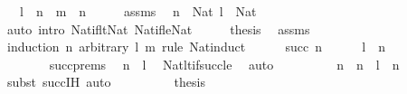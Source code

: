 \begin{isabellebody}
\ \ \ {\isachardoublequoteopen}l\ {\isacharminus}{\kern0pt}\ n\ {\isacharless}{\kern0pt}\ m\ {\isacharminus}{\kern0pt}\ n{\isachardoublequoteclose}\isanewline
%
\isadelimproof
%
\endisadelimproof
%
\isatagproof
{}\isamarkupfalse%
\ {\isacharminus}{\kern0pt}\isanewline
\ \ \isamarkupfalse%
\ assms\ \isamarkupfalse%
\ {\isachardoublequoteopen}n\ {\isacharcolon}{\kern0pt}\ Nat{\isachardoublequoteclose}\ {\isachardoublequoteopen}l\ {\isacharcolon}{\kern0pt}\ Nat{\isachardoublequoteclose}\isanewline
\ \ \ \ \isamarkupfalse%
\ {\isacharparenleft}{\kern0pt}auto\ intro{\isacharcolon}{\kern0pt}\ Nat{\isacharunderscore}{\kern0pt}if{\isacharunderscore}{\kern0pt}lt{\isacharunderscore}{\kern0pt}Nat\ Nat{\isacharunderscore}{\kern0pt}if{\isacharunderscore}{\kern0pt}le{\isacharunderscore}{\kern0pt}Nat{\isacharparenright}{\kern0pt}\isanewline
\ \ \isamarkupfalse%
\ \isamarkupfalse%
\ {\isacharquery}{\kern0pt}thesis\ \isamarkupfalse%
\ assms\isanewline
\ \ \isamarkupfalse%
\ {\isacharparenleft}{\kern0pt}induction\ n\ arbitrary{\isacharcolon}{\kern0pt}\ l\ m\ rule{\isacharcolon}{\kern0pt}\ Nat{\isacharunderscore}{\kern0pt}induct{\isacharparenright}{\kern0pt}\isanewline
\ \ \ \ \isamarkupfalse%
\ {\isacharparenleft}{\kern0pt}succ\ n{\isacharparenright}{\kern0pt}\isanewline
\ \ \ \ \isamarkupfalse%
\ {\isachardoublequoteopen}l\ {\isacharminus}{\kern0pt}\ n\ {\isasymnoteq}\ {}{\isachardoublequoteclose}\isanewline
\ \ \ \ \isamarkupfalse%
\ {\isacharminus}{\kern0pt}\isanewline
\ \ \ \ \ \ \isamarkupfalse%
\ succ{\isachardot}{\kern0pt}prems\ \isamarkupfalse%
\ {\isachardoublequoteopen}n\ {\isacharless}{\kern0pt}\ l{\isachardoublequoteclose}\ \isamarkupfalse%
\ Nat{\isacharunderscore}{\kern0pt}lt{\isacharunderscore}{\kern0pt}if{\isacharunderscore}{\kern0pt}succ{\isacharunderscore}{\kern0pt}le\ \isamarkupfalse%
\ auto\isanewline
\ \ \ \ \ \ \isamarkupfalse%
\ \isamarkupfalse%
\ {\isachardoublequoteopen}n\ {\isacharminus}{\kern0pt}\ n\ {\isacharless}{\kern0pt}\ l\ {\isacharminus}{\kern0pt}\ n{\isachardoublequoteclose}\ \isamarkupfalse%
\ {\isacharparenleft}{\kern0pt}subst\ succ{\isachardot}{\kern0pt}IH{\isacharparenright}{\kern0pt}\ auto\isanewline
\ \ \ \ \ \ \isamarkupfalse%
\ \isamarkupfalse%
\ {\isacharquery}{\kern0pt}thesis\ \isamarkupfalse%

\end{isabellebody}
